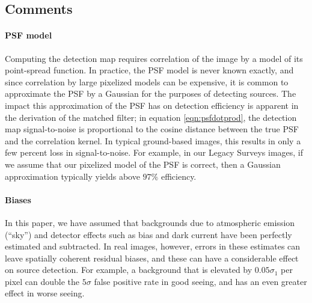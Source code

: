 \documentclass[letterpaper,preprint]{aastex62}
\newcommand{\psf}{\psi}
\begin{document}
\subsection{Comments}

\paragraph{PSF model}
Computing the detection map requires correlation of the image by a
model of its point-spread function.  In practice, the PSF model is
never known exactly, and since correlation by large pixelized models
can be expensive, it is common to approximate the PSF by a Gaussian
for the purposes of detecting sources.  The impact this approximation
of the PSF has on detection efficiency is apparent in the derivation
of the matched filter; in equation \ref{eqn:psfdotprod}, the detection
map signal-to-noise is proportional to the cosine distance between the
true PSF and the correlation kernel.  In typical ground-based images,
this results in only a few percent loss in signal-to-noise.  For
example, in our Legacy Surveys images, if we assume that our pixelized
model of the PSF is correct, then a Gaussian approximation typically
yields above $97\%$ efficiency.

\paragraph{Biases}
In this paper, we have assumed that backgrounds due to atmospheric
emission (``sky'') and detector effects such as bias and dark current
have been perfectly estimated and subtracted.  In real images,
however, errors in these estimates can leave spatially coherent
residual biases, and these can have a considerable effect on source
detection.  For example, a background that is elevated by $0.05
\sigma_1$ per pixel can double the $5\sigma$ false positive rate in
good seeing, and has an even greater effect in worse seeing.


%
\end{document}
